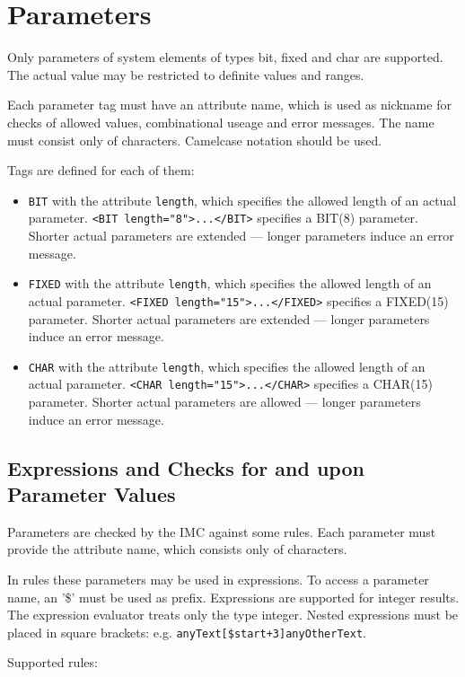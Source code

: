 \section{Parameters}
Only parameters of system elements of types bit, fixed and char are supported.
The actual value may be restricted to definite values and ranges.

Each parameter tag must have an attribute name, which is used as nickname 
for checks of allowed values, combinational useage and error messages.
The name must consist only of characters. Camelcase notation should be used.

Tags are defined for each of them:
\begin{itemize}
\item \verb|BIT| with the attribute \verb|length|, which specifies the 
   allowed length of an actual parameter. \verb|<BIT length="8">...</BIT>|
   specifies a BIT(8) parameter. Shorter actual parameters are extended --- 
   longer parameters induce an error message.
\item \verb|FIXED| with the attribute \verb|length|, which specifies the 
   allowed length of an actual parameter. \verb|<FIXED length="15">...</FIXED>|
   specifies a FIXED(15) parameter. Shorter actual parameters are extended --- 
   longer parameters induce an error message.
\item \verb|CHAR| with the attribute \verb|length|, which specifies the 
   allowed length of an actual parameter. \verb|<CHAR length="15">...</CHAR>|
   specifies a CHAR(15) parameter. Shorter actual parameters are allowed --- 
   longer parameters induce an error message.
\end{itemize}

\subsection{Expressions and Checks for and upon Parameter Values}
Parameters are checked by the IMC against some rules. Each parameter
must provide the attribute name, which  consists only of characters. 

In rules these parameters may be used in expressions.
To access a parameter name, an '\$' must be used as prefix.
Expressions are supported for integer results. The expression 
evaluator treats only the type integer.
Nested expressions must be placed in square brackets:
e.g. \verb|anyText[$start+3]anyOtherText|.


Supported rules:

